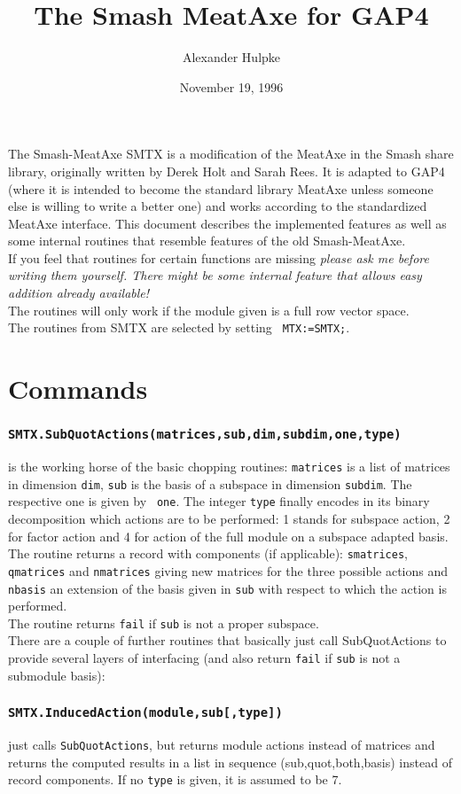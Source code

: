 \documentclass[12pt]{article}
\title{The Smash MeatAxe for {\sf GAP4}}
\author{Alexander Hulpke}
\date{November 19, 1996}
\def\smtxcmd#1{\subsubsection*{{\tt #1}}}
\def\SMTX{{\sf SMTX}}
\begin{document}
\maketitle
The {\sf Smash}-MeatAxe {\SMTX} is a modification of the MeatAxe in the {\sf
Smash} share library, originally written by Derek Holt and Sarah Rees. It is
adapted to {\sf GAP4}
(where it is intended to become the standard library MeatAxe
unless someone else is willing to write a better one) and works according to
the standardized MeatAxe interface. This document describes the implemented
features as well as some internal routines that resemble features of the
old {\sf Smash}-MeatAxe.\\
If you feel that routines for certain functions are missing {\em please ask
me before writing them yourself. There might be some internal feature that
allows easy addition already available!}\\
The routines will only work if the module given is a full row vector space.\\
The routines from {\SMTX} are selected by setting {\verb+ MTX:=SMTX;+}.

\section*{Commands}
\smtxcmd{SMTX.SubQuotActions(matrices,sub,dim,subdim,one,type)}
is the working horse of the basic chopping routines: {\tt matrices} is a
list of matrices in dimension {\tt dim}, {\tt sub} is the basis of a
subspace in dimension {\tt subdim}. The respective one is given by {\tt
one}. The integer {\tt type} finally encodes in its binary decomposition
which actions are to be performed: 1 stands for subspace action, 2 for
factor action and 4 for action of the full module
on a subspace adapted basis. The routine
returns a record with components (if applicable): {\tt smatrices}, {\tt
qmatrices} and {\tt nmatrices} giving new matrices for the three possible
actions and {\tt nbasis} an extension of the basis given in {\tt sub} with
respect to which the action is performed.\\
The routine returns {\tt fail} if {\tt sub} is not a proper subspace.\\
There are a couple of further routines that basically just call
SubQuotActions to provide several layers of interfacing (and also return
{\tt fail} if {\tt sub} is not a submodule basis):

\smtxcmd{SMTX.InducedAction(module,sub[,type])}
just calls {\tt SubQuotActions}, but returns module actions instead of
matrices and returns the computed results in a list in sequence
(sub,quot,both,basis) instead of record components. If no {\tt type} is
given, it is assumed to be 7.
\end{document}
